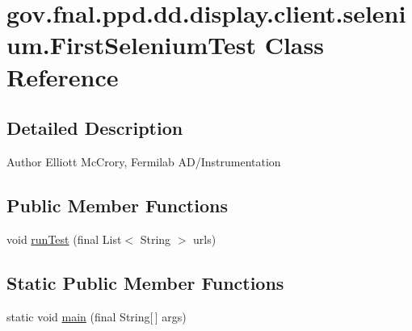 \hypertarget{classgov_1_1fnal_1_1ppd_1_1dd_1_1display_1_1client_1_1selenium_1_1FirstSeleniumTest}{\section{gov.\-fnal.\-ppd.\-dd.\-display.\-client.\-selenium.\-First\-Selenium\-Test Class Reference}
\label{classgov_1_1fnal_1_1ppd_1_1dd_1_1display_1_1client_1_1selenium_1_1FirstSeleniumTest}
}


\subsection{Detailed Description}
\begin{DoxyAuthor}{Author}
Elliott Mc\-Crory, Fermilab A\-D/\-Instrumentation 
\end{DoxyAuthor}
\subsection*{Public Member Functions}
\begin{DoxyCompactItemize}
\item 
void \hyperlink{classgov_1_1fnal_1_1ppd_1_1dd_1_1display_1_1client_1_1selenium_1_1FirstSeleniumTest_a2d2a0e6d397cb83c11e764529ea355e5}{run\-Test} (final List$<$ String $>$ urls)
\end{DoxyCompactItemize}
\subsection*{Static Public Member Functions}
\begin{DoxyCompactItemize}
\item 
static void \hyperlink{classgov_1_1fnal_1_1ppd_1_1dd_1_1display_1_1client_1_1selenium_1_1FirstSeleniumTest_a3d9afcec8509f5fdc5c7b837dc86337b}{main} (final String\mbox{[}$\,$\mbox{]} args)
\end{DoxyCompactItemize}


